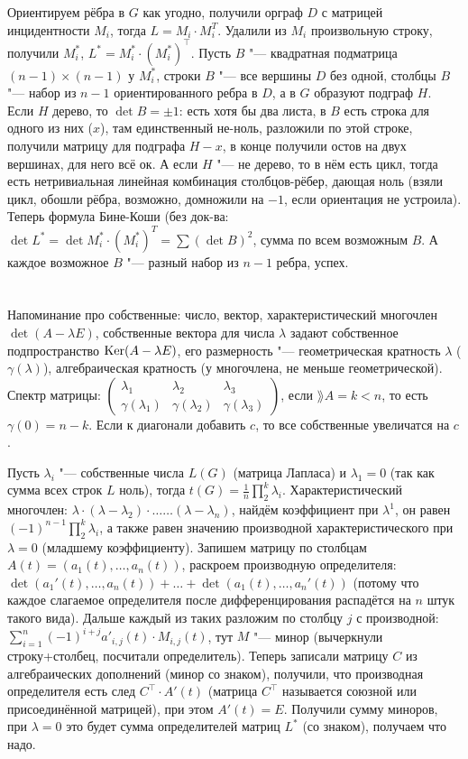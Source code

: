 Ориентируем рёбра в $G$ как угодно, получили орграф $D$ с матрицей инцидентности $M_i$, тогда $L=M_i \cdot M_i^T$.
Удалили из $M_i$ произвольную строку, получили $M_i^*$, $L^*=M_i^*\cdot (M_i^*)^\top$.
Пусть $B$ "--- квадратная подматрица $(n-1)\times(n-1)$ у $M_i^*$, строки $B$ "--- все вершины $D$ без одной, столбцы $B$ "--- набор из $n-1$
ориентированного ребра в $D$, а в $G$ образуют подграф $H$.
Если $H$ дерево, то $\det B = \pm 1$: есть хотя бы два листа, в $B$ есть строка для одного из них ($x$),
там единственный не-ноль, разложили по этой строке, получили матрицу для подграфа $H-x$, в конце получили остов на двух вершинах,
для него всё ок.
А если $H$ "--- не дерево, то в нём есть цикл, тогда есть нетривиальная линейная комбинация столбцов-рёбер, дающая ноль
(взяли цикл, обошли рёбра, возможно, домножили на $-1$, если ориентация не устроила).
Теперь формула Бине-Коши (без док-ва: $\det L^* = \det M_i^* \cdot (M_i^*)^T = \sum (\det B)^2$, сумма по всем возможным $B$.
А каждое возможное $B$ "--- разный набор из $n-1$ ребра, успех.

\section{} %
Напоминание про собственные: число, вектор, характеристический многочлен $\det(A-\lambda E)$, собственные вектора для числа $\lambda$ задают собственное подпространство $\operatorname{Ker} (A-\lambda E)$,
его размерность "--- геометрическая кратность $\lambda$ ($\gamma(\lambda)$), алгебраическая кратность (у многочлена, не меньше геометрической).
Спектр матрицы: $\begin{pmatrix}\lambda_1 & \lambda_2 & \lambda_3 \\ \gamma(\lambda_1) & \gamma(\lambda_2) & \gamma(\lambda_3) \end{pmatrix}$,
если $\rang A = k < n$, то есть $\gamma(0)=n-k$.
Если к диагонали добавить $c$, то все собственные увеличатся на $c$.

Пусть $\lambda_i$ "--- собственные числа $L(G)$ (матрица Лапласа) и $\lambda_1=0$ (так как сумма всех строк $L$ ноль), тогда
$t(G)=\frac{1}{n} \prod_2^k \lambda_i$.
Характеристический многочлен: $\lambda \cdot (\lambda-\lambda_2) \cdot \dots \dots (\lambda-\lambda_n)$, найдём коэффициент
при $\lambda^1$, он равен $(-1)^{n-1} \prod_2^k \lambda_i$, а также равен значению производной характеристического при $\lambda=0$ (младшему коэффициенту).
Запишем матрицу по столбцам $A(t)=(a_1(t), \dots, a_n(t))$, раскроем производную определителя: $\det(a_1'(t), \dots, a_n(t)) + \dots + \det(a_1(t), \dots, a_n'(t))$
(потому что каждое слагаемое определителя после дифференцирования распадётся на $n$ штук такого вида).
Дальше каждый из таких разложим по столбцу $j$ с производной: $\sum_{i=1}^n (-1)^{i+j}a'_{i,j}(t)\cdot M_{i,j}(t)$, тут $M$ "--- минор (вычеркнули строку+столбец, посчитали определитель).
Теперь записали матрицу $C$ из алгебраических дополнений (минор со знаком), получили, что производная определителя есть след $C^\top \cdot A'(t)$ (матрица $C^\top$ называется союзной
или присоединённой матрицей), при этом $A'(t)=E$.
Получили сумму миноров, при $\lambda=0$ это будет сумма определителей матриц $L^*$ (со знаком), получаем что надо.


